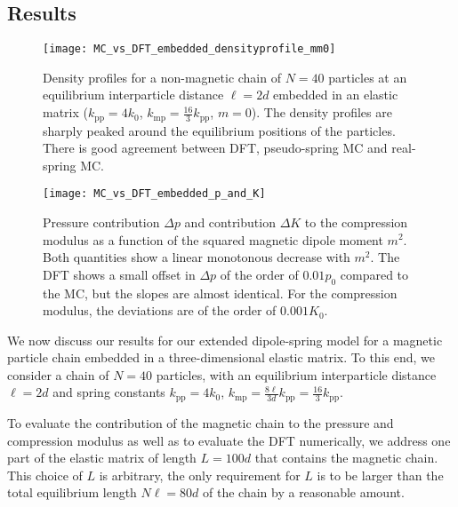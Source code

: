 \documentclass[aps,pre,twocolumn,superscriptaddress,nofootinbib]{revtex4}
\begin{document}
\subsection{Results}

%
\begin{figure*}[t]
	\texttt{[image: MC\_vs\_DFT\_embedded\_densityprofile\_mm0]}
	\caption{Density profiles for a non-magnetic chain of $N = 40$ particles at an equilibrium interparticle distance $\ell = 2d$ embedded in an elastic matrix ($k_\textrm{pp} = 4 k_0$, $k_\textrm{mp} =  \frac{16}{3} k_\textrm{pp}$, $m = 0$). The density profiles are sharply peaked around the equilibrium positions of the particles. There is good agreement between DFT, pseudo-spring MC and real-spring MC.}
	\label{Fig.MC_vs_DFT_embedded_densityprofile_mm0}
\end{figure*}
%

%
\begin{figure*}[t]
	\texttt{[image: MC\_vs\_DFT\_embedded\_p\_and\_K]}
	\caption{Pressure contribution $\Delta p$ and contribution $\Delta K$ to the compression modulus as a function of the squared magnetic dipole moment $m^2$. Both quantities show a linear monotonous decrease with $m^2$. The DFT shows a small offset in $\Delta p$ of the order of $0.01 p_0$ compared to the MC, but the slopes are almost identical. For the compression modulus, the deviations are of the order of $0.001 K_0$.}
	\label{Fig.MC_vs_DFT_embedded_p_and_K}
\end{figure*}
%


We now discuss our results for our extended dipole-spring model for a magnetic particle chain embedded in a three-dimensional elastic matrix.
To this end, we consider a chain of $N = 40$ particles, with an equilibrium interparticle distance $\ell = 2d$ and spring constants $k_\textrm{pp} = 4 k_0$, $k_\textrm{mp} = \frac{8\ell}{3d} k_\textrm{pp} = \frac{16}{3} k_\textrm{pp}$. 

To evaluate the contribution of the magnetic chain to the pressure and compression modulus as well as to evaluate the DFT numerically, we address one part of the elastic matrix of length $L = 100d$ that contains the magnetic chain. 
This choice of $L$ is arbitrary, the only requirement for $L$ is to be larger than the total equilibrium length $N\ell = 80d$ of the chain by a reasonable amount. 
\end{document}
